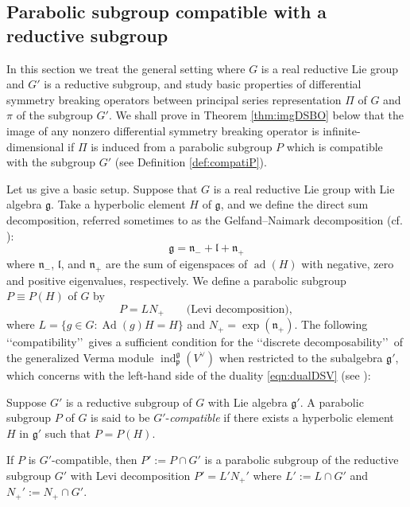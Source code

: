 \subsection{Parabolic subgroup compatible 
 with a reductive subgroup}
\label{subsec:PGcompati}
In this section we treat the general setting 
 where $G$ is a real reductive Lie group
 and $G'$ is a reductive subgroup,
 and study basic properties
 of differential symmetry breaking operators
 between principal series representation $\Pi$
 of $G$
 and $\pi$ of the subgroup $G'$.  
We shall prove in Theorem \ref{thm:imgDSBO} below
 that the image of any nonzero differential symmetry breaking operator
 is infinite-dimensional 
 if $\Pi$ is induced from a parabolic subgroup $P$
 which is compatible with the subgroup $G'$
 (see Definition \ref{def:compatiP}).  



Let us give a basic setup.  
Suppose that $G$ is a real reductive Lie group
 with Lie algebra ${\mathfrak{g}}$.  
Take a hyperbolic element $H$ of ${\mathfrak{g}}$, 
 and we define the direct sum decomposition, 
 referred sometimes to as the Gelfand--Naimark decomposition
 (cf. \cite{GN}):
\[
   {\mathfrak{g}}={\mathfrak{n}}_- + {\mathfrak{l}} + {\mathfrak{n}}_+
\]
 where ${\mathfrak{n}}_-$, ${\mathfrak{l}}$, and ${\mathfrak{n}}_+$
 are the sum of eigenspaces
 of ${\operatorname{ad}}(H)$ with negative, zero and positive eigenvalues, 
respectively.  
We define a parabolic subgroup $P \equiv P(H)$ of $G$ by
\[
  P=L N_+
\qquad
 \text{(Levi decomposition)}, 
\]
 where $L = \{g \in G: {\operatorname{Ad}}(g)H=H\}$
 and $N_+=\exp ({\mathfrak{n}}_+)$.  
The following \lq\lq{compatibility}\rq\rq\ gives a sufficient condition
 for the \lq\lq{discrete decomposability}\rq\rq\
 of the generalized Verma module ${\operatorname{ind}}_{\mathfrak{p}}^{\mathfrak{g}}(V^{\vee})$
 when restricted to the subalgebra ${\mathfrak{g}}'$, 
 which concerns with the left-hand side
 of the duality \eqref{eqn:dualDSV}
 (see \cite[Thm.~4.1]{xktransgp12}):
\begin{definition}
\label{def:compatiP}
Suppose $G'$ is a reductive subgroup of $G$ with Lie algebra ${\mathfrak{g}}'$. A parabolic subgroup $P$ of $G$ is said to be $G'$-{\it{compatible}}
 if there exists a hyperbolic element $H$ in ${\mathfrak{g}}'$
 such that $P=P(H)$.  
\end{definition}

If $P$ is $G'$-compatible, 
 then $P' :=P \cap G'$
 is a parabolic subgroup of the reductive subgroup $G'$
 with Levi decomposition $P' = L' N_+'$
 where $L' :=L \cap G'$ and $N_+' :=N_+ \cap G'$.  

